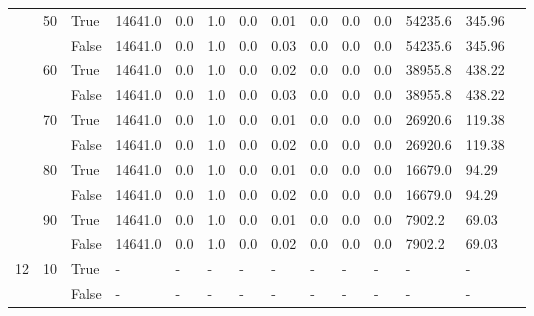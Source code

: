 \begin{landscape}
\begin{small}
\begin{longtable}[c]{@{}lll|ll|ll|ll|ll|lll@{}}
   & 50 & True  & 14641.0         & 0.0            & 1.0           & 0.0           & 0.01          & 0.0           & 0.0           & 0.0           & 54235.6       & 345.96      &  \\
   &    & False & 14641.0         & 0.0            & 1.0           & 0.0           & 0.03          & 0.0           & 0.0           & 0.0           & 54235.6       & 345.96      &  \\
   & 60 & True  & 14641.0         & 0.0            & 1.0           & 0.0           & 0.02          & 0.0           & 0.0           & 0.0           & 38955.8       & 438.22      &  \\
   &    & False & 14641.0         & 0.0            & 1.0           & 0.0           & 0.03          & 0.0           & 0.0           & 0.0           & 38955.8       & 438.22      &  \\
   & 70 & True  & 14641.0         & 0.0            & 1.0           & 0.0           & 0.01          & 0.0           & 0.0           & 0.0           & 26920.6       & 119.38      &  \\
   &    & False & 14641.0         & 0.0            & 1.0           & 0.0           & 0.02          & 0.0           & 0.0           & 0.0           & 26920.6       & 119.38      &  \\
   & 80 & True  & 14641.0         & 0.0            & 1.0           & 0.0           & 0.01          & 0.0           & 0.0           & 0.0           & 16679.0       & 94.29       &  \\
   &    & False & 14641.0         & 0.0            & 1.0           & 0.0           & 0.02          & 0.0           & 0.0           & 0.0           & 16679.0       & 94.29       &  \\
   & 90 & True  & 14641.0         & 0.0            & 1.0           & 0.0           & 0.01          & 0.0           & 0.0           & 0.0           & 7902.2        & 69.03       &  \\
   &    & False & 14641.0         & 0.0            & 1.0           & 0.0           & 0.02          & 0.0           & 0.0           & 0.0           & 7902.2        & 69.03       &  \\
  \midrule
12 & 10 & True  & -               & -              & -             & -             & -             & -             & -             & -             & -             & -           &  \\
   &    & False & -               & -              & -             & -             & -             & -             & -             & -             & -             & -           &  \\

\end{longtable}
\end{small}
\end{landscape}
